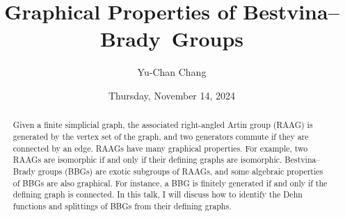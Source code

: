 \documentclass{UAmathtalk}
\author{Yu-Chan Chang}
\title{Graphical Properties of Bestvina--Brady~Groups}
\date{Thursday, November 14, 2024}
\begin{document}
\maketitle

\begin{abstract}
Given a finite simplicial graph, the associated right-angled Artin group (RAAG) is generated by the vertex set of the graph, and two generators commute if they are connected by an edge. RAAGs have many graphical properties. For example, two RAAGs are isomorphic if and only if their defining graphs are isomorphic. Bestvina--Brady groups (BBGs) are exotic subgroups of RAAGs, and some algebraic properties of BBGs are also graphical. For instance, a BBG is finitely generated if and only if the defining graph is connected. In this talk, I will discuss how to identify the Dehn functions and splittings of BBGs from their defining graphs.
\end{abstract}
\end{document}
